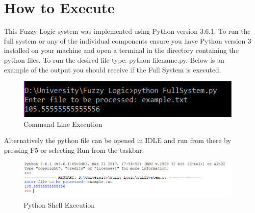 \documentclass{article}
\begin{document}
\section{How to Execute}
This Fuzzy Logic system was implemented using Python version 3.6.1. To run the full system or any of the individual components ensure you have Python version 3 installed on your machine and open a terminal in the directory containing the python files. To run the desired file type: python {filename}.py. Below is an example of the output you should receive if the Full System is executed.
\begin{figure}[H]
\includegraphics[width=12cm]{manual1}
\caption{Command Line Execution}
\end{figure}
Alternatively the python file can be opened in IDLE and run from there by pressing F5 or selecting Run from the taskbar.
\begin{figure}[H]
\includegraphics[width=12cm]{manual2}
\caption{Python Shell Execution}
\end{figure}
\end{document}
